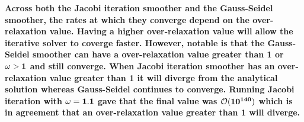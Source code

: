 \bigskip
\begin{fminipage}{0.9\linewidth}
    \textbf{Across both the Jacobi iteration smoother and the Gauss-Seidel smoother, the rates at which they converge depend on the over-relaxation value. Having a higher over-relaxation value will allow the iterative solver to coverge faster. However, notable is that the Gauss-Seidel smoother can have a over-relaxation value greater than 1 or $\bf \omega > 1$ and still converge. When Jacobi iteration smoother has an over-relaxation value greater than 1 it will diverge from the analytical solution whereas Gauss-Seidel continues to converge. Running Jacobi iteration with $\bf \omega = 1.1$ gave that the final value was $\bf \mathcal{O}(10^{140})$ which is in agreement that an over-relaxation value greater than 1 will diverge.}
\end{fminipage}